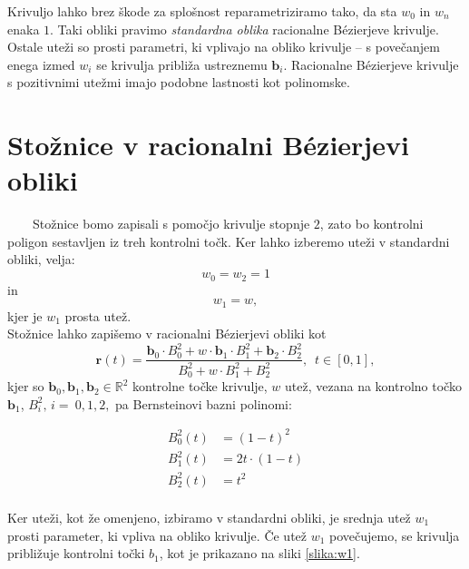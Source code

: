 \documentclass[a4paper,11pt]{article}
\theoremstyle{definition}
\theoremstyle{plain}
\begin{document}
Krivuljo lahko brez škode za splošnost reparametriziramo tako, da sta $w_0$ in $w_n$ enaka $1$. Taki obliki pravimo \emph{standardna oblika} racionalne B\'ezierjeve krivulje.
Ostale uteži so prosti parametri, ki vplivajo na obliko krivulje -- s povečanjem enega izmed $w_i$ se krivulja približa ustreznemu $\boldsymbol{b}_i$. Racionalne B\'ezierjeve krivulje s pozitivnimi utežmi imajo podobne lastnosti kot polinomske. \\



\section{Stožnice v racionalni B\'ezierjevi obliki}
\ \ \ \
Stožnice bomo zapisali s pomočjo krivulje stopnje $2$, zato bo kontrolni poligon sestavljen iz treh kontrolni točk. Ker lahko izberemo uteži v standardni obliki, velja: 
$$w_0=w_2=1 $$
in
$$ w_1=w,$$
kjer je $w_1$ prosta utež.
\\
Stožnice lahko zapišemo v racionalni B\'ezierjevi obliki kot 
$$\boldsymbol{r}(t)=\frac{\boldsymbol{b}_0\cdot B_0^2+w\cdot\boldsymbol{b}_1\cdot B_1^2+\boldsymbol{b}_2\cdot B_2^2}{ B_0^2+w\cdot B_1^2+ B_2^2},\,\,\, t\in[0,1],$$
kjer so $\boldsymbol{b}_0, \boldsymbol{b}_1, \boldsymbol{b}_2 \in \mathbb{R}^2$ kontrolne točke krivulje, $w$ utež, vezana na kontrolno točko $\boldsymbol{b}_1$, $B_i^2,\,i=~0,1,2,$ pa Bernsteinovi bazni polinomi:

\begin{align*}
B_0^2(t) &= (1-t)^2 \\
B_1^2(t) &= 2t\cdot(1-t) \\
B_2^2(t) &= t^2 \\
\end{align*}

Ker uteži, kot že omenjeno, izbiramo v standardni obliki, je srednja utež $w_1$ prosti parameter, ki vpliva na obliko krivulje. Če utež $w_1$ povečujemo, se krivulja približuje kontrolni točki $b_1$, kot je prikazano na sliki \ref{slika:w1}.
\end{document}
